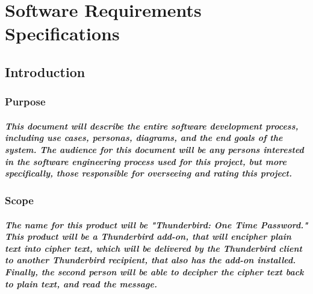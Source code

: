 
\chapter{Software Requirements Specifications}
\section{Introduction}

\subsection{Purpose}
\paragraph{This document will describe the entire software development process, including use cases, personas, diagrams, and the end goals of the system. The audience for this document will be any persons interested in the software engineering process used for this project, but more specifically, those responsible for overseeing and rating this project.}



\subsection{Scope}
\paragraph{The name for this product will be "Thunderbird: One Time Password." This product will be a Thunderbird add-on, that will encipher plain text into cipher text, which will be delivered by the Thunderbird client to another Thunderbird recipient, that also has the add-on installed. Finally, the second person will be able to decipher the cipher text back to plain text, and read the message.}


